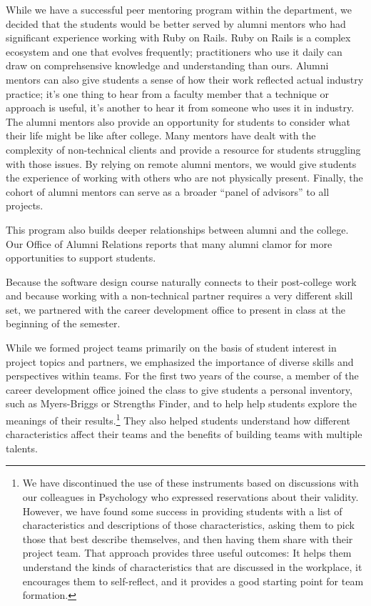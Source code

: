 While we have a successful peer mentoring program within the department,
we decided that the students would be better served by alumni mentors
who had significant experience working with Ruby on Rails.
Ruby on Rails is a complex ecosystem and one that evolves
frequently; practitioners who use it daily can draw on
comprehsensive knowledge and understanding than ours.  Alumni mentors
can also give students a sense of how their work
reflected actual industry practice; it's one thing to hear from a
faculty member that a technique or approach is useful, it's another
to hear it from someone who uses it in industry.  The
alumni mentors also provide an opportunity for students to consider
what their life might be like after college.  Many mentors have
dealt with the complexity of non-technical clients and provide a
resource for students struggling with those issues.  By relying on
remote alumni mentors, we would give students the experience of
working with others who are not physically present.  Finally, the
cohort of alumni mentors can serve as a broader ``panel of
advisors'' to all projects.

This program also builds deeper relationships between
alumni and the college.  Our Office of Alumni Relations reports
that many alumni clamor for more opportunities to support
students.

Because the software design course naturally connects to their
post-college work and because working with a non-technical partner
requires a very different skill set, we partnered with the
career development office to present in class at the beginning of
the semester.

While we formed project teams primarily on the basis of student interest in 
project topics and partners, we
emphasized the importance of diverse skills and perspectives within teams.
For the first two years of the course, a member of the career 
development office joined the class to give students a personal 
inventory, such as Myers-Briggs or Strengths Finder, and to help
help students explore the meanings of their 
results.\footnote{We have discontinued the use of
these instruments based on discussions with our colleagues in
Psychology who expressed reservations about their validity.  However,
we have found some success in providing
students with a list of characteristics and descriptions of those
characteristics, asking them to pick those that
best describe themselves, and then having them share with their project
team.  That approach provides three useful outcomes:
It helps them understand the kinds of characteristics that are discussed
in the workplace, it encourages them to self-reflect, and it provides
a good starting point for team formation.}
They also helped students understand how different
characteristics affect their teams and the benefits of building
teams with multiple talents.

